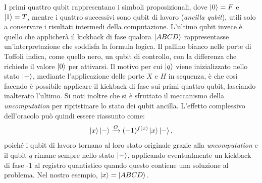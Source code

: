 \documentclass{book}
\theoremstyle{definition}
\theoremstyle{definition}
\theoremstyle{definition}
\theoremstyle{plain}
\theoremstyle{plain}
\theoremstyle{plain}
\theoremstyle{plain}
\begin{document}
I primi quattro qubit rappresentano i simboli proposizionali, dove $\ket{0} = F$ e $\ket{1} = T$, mentre i quattro successivi sono qubit di lavoro (\emph{ancilla qubit}), utili solo a conservare i risultati intermedi della computazione. L'ultimo qubit invece è quello che applicherà il kickback di fase qualora $\ket{ABCD}$ rappresentasse un'interpretazione che soddisfa la formula logica. Il pallino bianco nelle porte di Toffoli indica, come quello nero, un qubit di controllo, con la differenza che richiede il valore $\ket{0}$ per attivarsi. Il motivo per cui $\ket{q}$ viene inizializzato nello stato $\ket{-}$, mediante l'applicazione delle porte $X$ e $H$ in sequenza, è che così facendo è possibile applicare il kickback di fase sui primi quattro qubit, lasciando inalterato l'ultimo. Si noti inoltre che si è sfruttato il meccanismo della \emph{uncomputation} per ripristinare lo stato dei qubit ancilla. L'effetto complessivo dell'oracolo può quindi essere riassunto come:
\begin{displaymath}
\ket{x} \ket{-} \xrightarrow{O} (-1)^{f(x)} \ket{x} \ket{-},
\end{displaymath}
poiché i qubit di lavoro tornano al loro stato originale grazie alla \emph{uncomputation} e il qubit $q$ rimane sempre nello stato $\ket{-}$, applicando eventualmente un kickback di fase -1 al registro quantistico quando questo contiene una soluzione al problema. Nel nostro esempio, $\ket{x} = \ket{ABCD}$.
\end{document}
